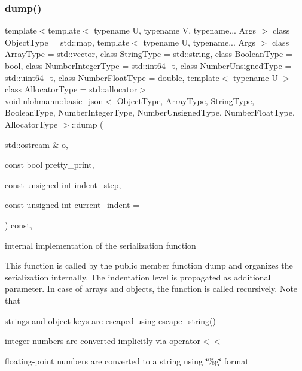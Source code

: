 \subsubsection{\texorpdfstring{dump()}{dump()}\hspace{0.1cm}{\footnotesize\ttfamily [2/2]}}
{\footnotesize\ttfamily template$<$template$<$ typename U, typename V, typename... Args $>$ class Object\+Type = std\+::map, template$<$ typename U, typename... Args $>$ class Array\+Type = std\+::vector, class String\+Type  = std\+::string, class Boolean\+Type  = bool, class Number\+Integer\+Type  = std\+::int64\+\_\+t, class Number\+Unsigned\+Type  = std\+::uint64\+\_\+t, class Number\+Float\+Type  = double, template$<$ typename U $>$ class Allocator\+Type = std\+::allocator$>$ \\
void \hyperlink{classnlohmann_1_1basic__json}{nlohmann\+::basic\+\_\+json}$<$ Object\+Type, Array\+Type, String\+Type, Boolean\+Type, Number\+Integer\+Type, Number\+Unsigned\+Type, Number\+Float\+Type, Allocator\+Type $>$\+::dump (\begin{DoxyParamCaption}\item[{std\+::ostream \&}]{o,  }\item[{const bool}]{pretty\+\_\+print,  }\item[{const unsigned int}]{indent\+\_\+step,  }\item[{const unsigned int}]{current\+\_\+indent = {} }\end{DoxyParamCaption}) const\hspace{0.3cm}{\ttfamily [inline]}, {\ttfamily [private]}}



internal implementation of the serialization function 

This function is called by the public member function dump and organizes the serialization internally. The indentation level is propagated as additional parameter. In case of arrays and objects, the function is called recursively. Note that


\begin{DoxyItemize}
\item strings and object keys are escaped using {\ttfamily \hyperlink{classnlohmann_1_1basic__json_a287187938417b32a548e476058689d80}{escape\+\_\+string()}}
\item integer numbers are converted implicitly via {\ttfamily operator$<$$<$}
\item floating-\/point numbers are converted to a string using {\ttfamily \char`\"{}\%g\char`\"{}} format
\end{DoxyItemize}


